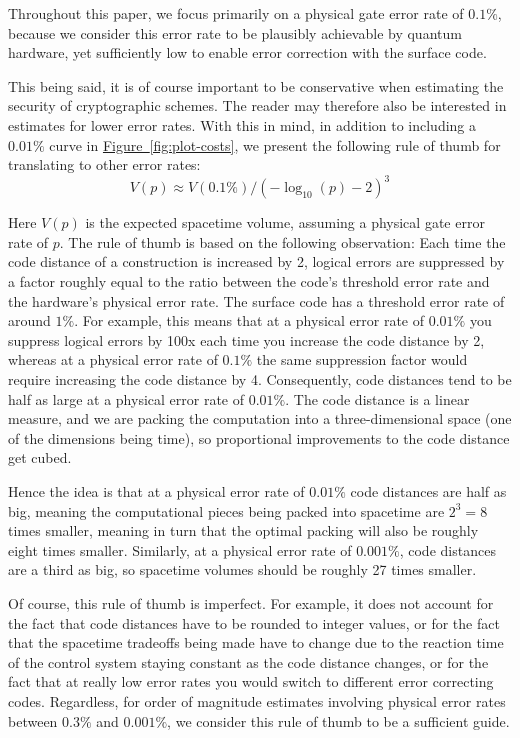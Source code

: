 \documentclass[superscriptaddress,notitlepage,longbibliography]{revtex4-1}
\theoremstyle{definition}
\theoremstyle{definition}
\newcommand{\fig}[1]{\hyperref[fig:#1]{Figure~\ref*{fig:#1}}}
\begin{document}
Throughout this paper, we focus primarily on a physical gate error rate of $0.1\%$, because we consider this error rate to be plausibly achievable by quantum hardware, yet sufficiently low to enable error correction with the surface code.

This being said, it is of course important to be conservative when estimating the security of cryptographic schemes.
The reader may therefore also be interested in estimates for lower error rates.
With this in mind, in addition to including a $0.01\%$ curve in \fig{plot-costs}, we present the following rule of thumb for translating to other error rates:
$$V(p) \approx V(0.1\%) / (-\log_{10}(p) - 2)^3$$

Here $V(p)$ is the expected spacetime volume, assuming a physical gate error rate of $p$.
The rule of thumb is based on the following observation:
Each time the code distance of a construction is increased by 2, logical errors are suppressed by a factor roughly equal to the ratio between the code's threshold error rate and the hardware's physical error rate.
The surface code has a threshold error rate of around $1\%$.
For example, this means that at a physical error rate of $0.01\%$ you suppress logical errors by 100x each time you increase the code distance by 2, whereas at a physical error rate of $0.1\%$ the same suppression factor would require increasing the code distance by 4.
Consequently, code distances tend to be half as large at a physical error rate of $0.01\%$.
The code distance is a linear measure, and we are packing the computation into a three-dimensional space (one of the dimensions being time), so proportional improvements to the code distance get cubed.

Hence the idea is that at a physical error rate of $0.01\%$ code distances are half as big, meaning the computational pieces being packed into spacetime are $2^3 = 8$ times smaller, meaning in turn that the optimal packing will also be roughly eight times smaller.
Similarly, at a physical error rate of $0.001\%$, code distances are a third as big, so spacetime volumes should be roughly 27 times smaller.

Of course, this rule of thumb is imperfect.
For example, it does not account for the fact that code distances have to be rounded to integer values, or for the fact that the spacetime tradeoffs being made have to change due to the reaction time of the control system staying constant as the code distance changes, or for the fact that at really low error rates you would switch to different error correcting codes.
Regardless, for order of magnitude estimates involving physical error rates between $0.3\%$ and $0.001\%$, we consider this rule of thumb to be a sufficient guide.
\end{document}

